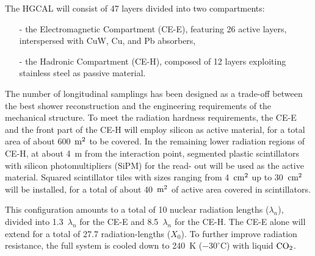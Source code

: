 The HGCAL will consist of 47 layers divided into two compartments:
\begin{itemize}
    \item [-] the Electromagnetic  Compartment (CE-E), featuring 26 active layers, interspersed with CuW, Cu, and Pb absorbers,
    \item [-] the Hadronic Compartment (CE-H), composed of 12 layers exploiting stainless steel as passive material.
\end{itemize}
The number of longitudinal samplings has been designed as a trade-off between the best shower reconstruction and the engineering requirements of the mechanical structure.
To meet the radiation hardness requirements, the CE-E and the front part of the CE-H will employ silicon as active material, for a total area of about 600~$\textnormal{m}^2$ to be covered. In the remaining lower radiation regions of CE-H, at about 4~m from the interaction point, segmented plastic scintillators with silicon photomultipliers (SiPM) for the read- out will be used as the active material. Squared scintillator tiles with sizes ranging from 4~$\textnormal{cm}^2$ up to 30~$\textnormal{cm}^2$ will be installed, for a total of about 40~$\textnormal{m}^2$ of active area covered in scintillators.

This configuration amounts to a total of 10 nuclear radiation lengths ($\lambda_n$), divided into 1.3~$\lambda_n$ for the CE-E and 8.5~$\lambda_n$ for the CE-H. The CE-E alone will extend for a total of 27.7 radiation-lengths ($X_0$).
To further improve radiation resistance, the full system is cooled down to 240~K ($-30^{\circ}$C) with liquid $\textnormal{CO}_2$.

